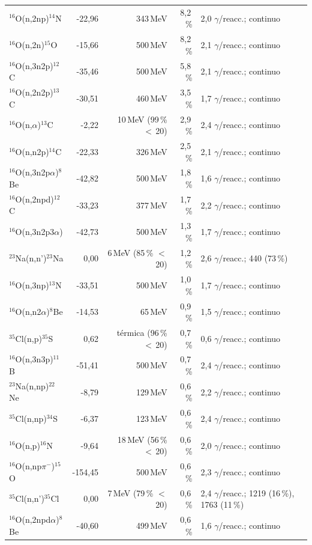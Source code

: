 \documentclass[11pt,a4paper]{article}
\begin{document}
{\begin{longtable}{p{4.4cm}rrrp{4.6cm}}
$^{16}$O(n,2np)$^{14}$N & -22,96 & 343\,MeV & 8,2\,\% & 2,0 $\gamma$/reacc.; continuo \\
$^{16}$O(n,2n)$^{15}$O & -15,66 & 500\,MeV & 8,2\,\% & 2,1 $\gamma$/reacc.; continuo \\
$^{16}$O(n,3n2p)$^{12}$C & -35,46 & 500\,MeV & 5,8\,\% & 2,1 $\gamma$/reacc.; continuo \\
$^{16}$O(n,2n2p)$^{13}$C & -30,51 & 460\,MeV & 3,5\,\% & 1,7 $\gamma$/reacc.; continuo \\
$^{16}$O(n,$\alpha$)$^{13}$C & -2,22 & 10\,MeV (99\,\% $<$\,20) & 2,9\,\% & 2,4 $\gamma$/reacc.; continuo \\
$^{16}$O(n,n2p)$^{14}$C & -22,33 & 326\,MeV & 2,5\,\% & 2,1 $\gamma$/reacc.; continuo \\
$^{16}$O(n,3n2p$\alpha$)$^{8}$Be & -42,82 & 500\,MeV & 1,8\,\% & 1,6 $\gamma$/reacc.; continuo \\
$^{16}$O(n,2npd)$^{12}$C & -33,23 & 377\,MeV & 1,7\,\% & 2,2 $\gamma$/reacc.; continuo \\
$^{16}$O(n,3n2p3$\alpha$) & -42,73 & 500\,MeV & 1,3\,\% & 1,7 $\gamma$/reacc.; continuo \\
$^{23}$Na(n,n')$^{23}$Na & 0,00 & 6\,MeV (85\,\% $<$\,20) & 1,2\,\% & 2,6 $\gamma$/reacc.; 440 (73\,\%) \\
$^{16}$O(n,3np)$^{13}$N & -33,51 & 500\,MeV & 1,0\,\% & 1,7 $\gamma$/reacc.; continuo \\
$^{16}$O(n,n2$\alpha$)$^{8}$Be & -14,53 & 65\,MeV & 0,9\,\% & 1,5 $\gamma$/reacc.; continuo \\
$^{35}$Cl(n,p)$^{35}$S & 0,62 & térmica (96\,\% $<$\,20) & 0,7\,\% & 0,6 $\gamma$/reacc.; continuo \\
$^{16}$O(n,3n3p)$^{11}$B & -51,41 & 500\,MeV & 0,7\,\% & 2,4 $\gamma$/reacc.; continuo \\
$^{23}$Na(n,np)$^{22}$Ne & -8,79 & 129\,MeV & 0,6\,\% & 2,2 $\gamma$/reacc.; continuo \\
$^{35}$Cl(n,np)$^{34}$S & -6,37 & 123\,MeV & 0,6\,\% & 2,4 $\gamma$/reacc.; continuo \\
$^{16}$O(n,p)$^{16}$N & -9,64 & 18\,MeV (56\,\% $<$\,20) & 0,6\,\% & 2,0 $\gamma$/reacc.; continuo \\
$^{16}$O(n,np$\pi^-$)$^{15}$O & -154,45 & 500\,MeV & 0,6\,\% & 2,3 $\gamma$/reacc.; continuo \\
$^{35}$Cl(n,n')$^{35}$Cl & 0,00 & 7\,MeV (79\,\% $<$\,20) & 0,6\,\% & 2,4 $\gamma$/reacc.; 1219 (16\,\%), 1763 (11\,\%) \\
$^{16}$O(n,2npd$\alpha$)$^{8}$Be & -40,60 & 499\,MeV & 0,6\,\% & 1,6 $\gamma$/reacc.; continuo \\

\end{longtable}}
\end{document}
